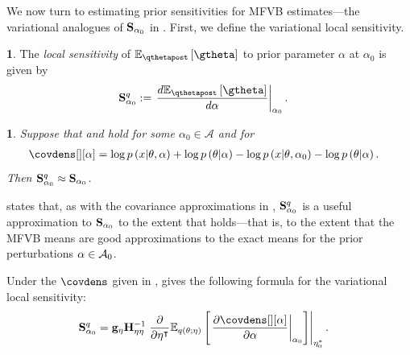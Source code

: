 \documentclass{article}\usepackage[]{graphicx}\usepackage[]{color}
\theoremstyle{definition}
\newtheorem{defn}{\protect\definitionname}
\theoremstyle{plain}
\theoremstyle{plain}
\theoremstyle{plain}
\newtheorem{cor}{\protect\corollaryname}
\theoremstyle{definition}
\theoremstyle{plain}
\theoremstyle{plain}
\providecommand{\corollaryname}{Corollary}
\providecommand{\definitionname}{Definition}
\begin{document}
We now turn to estimating prior sensitivities for MFVB estimates---the
variational analogues of $\mathbf{S}_{\alpha_{0}}$ in .
First, we define the variational local sensitivity.
\begin{defn}
The \textit{local sensitivity} of $\eqgtheta$ to prior parameter
$\alpha$ at $\alpha_{0}$ is given by
\begin{align*}
\qsens & :=\left.\frac{d\eqgtheta}{d\alpha}\right|_{\alpha_{0}}.
\end{align*}
\end{defn}
\begin{cor}
\label{cor:sens_vb_prior}Suppose that \vbassum and 
hold for some $\alpha_{0}\in\mathcal{A}$ and for
\begin{align*}
\covdens[][\alpha] & =
    \log p\left(x\vert\theta,\alpha\right) +
    \log p\left(\theta\vert\alpha\right)-
    \log p\left(x\vert\theta,\alpha_{0}\right)-
    \log p\left(\theta\vert\alpha\right).
\end{align*}
Then $\mathbf{S}_{\alpha_{0}}^{q}\approx\mathbf{S}_{\alpha_{0}}$.
\end{cor}
 states that, as with the covariance approximations
in , $\mathbf{S}_{\alpha_{0}}^{q}$ is a useful approximation to $\mathbf{S}_{\alpha_{0}}$
to the extent that  holds---that is, to
the extent that the MFVB means are good approximations to the exact means for
the prior perturbations $\alpha\in\mathcal{A}_{0}$.

Under the $\covdens$ given in ,
gives the following formula for the variational local sensitivity:
\begin{align}
\qsens & =\eggrad\klhess^{-1}\left.\frac{\partial}{\partial\eta^{\trans}}
    \mbe_{q\left(\theta;\eta\right)}
    \left[\left.\frac{\partial\covdens[][\alpha]}{\partial\alpha}
    \right|_{\alpha_{0}}\right]\right|_{\etaoptzero}.
    \label{eq:variational_local_robustness}
\end{align}
\end{document}
